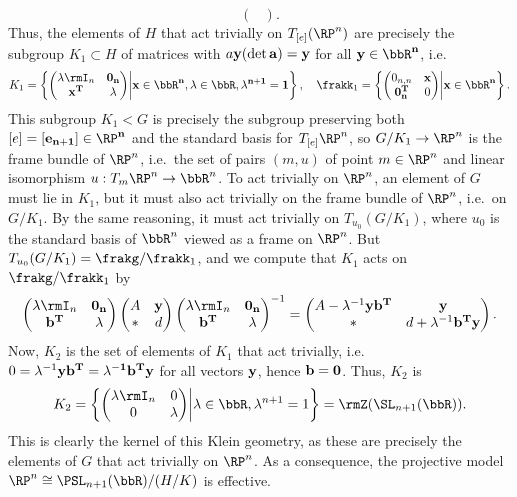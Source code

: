 \begin{example}
\[\begin{pmatrix}
    \end{pmatrix}.
    \]
    Thus, the elements of $H$ that act trivially on $T_{[e]}(\RP^n)$ are precisely the subgroup $K_1\subset H$ of matrices with $a\bf{y} (\det a)=\bf{y}$ for all $\bf{y}\in\bbR^n$, i.e.\ 
    \[K_1=\left\{ 
        \begin{pmatrix}
            \lambda \rmI_n & \bf{0}_n \\
            \bf{x}^T & \lambda
        \end{pmatrix} \middle| \bf{x}\in\bbR^n,\lambda\in\bbR, \lambda^{n+1}=1
    \right\}, \quad \frakk_1=\left\{ 
        \begin{pmatrix}
            \mathrm{0}_{n,n} & \bf{x} \\
            \bf{0}_n^T & 0
        \end{pmatrix} \middle| \bf{x}\in\bbR^n\right\}.\]
    This subgroup $K_1<G$ is precisely the subgroup preserving both $[e]=[\bf{e}_{n+1}]\in\RP^n$ and the standard basis for $T_{[e]}\RP^n$, so $G\slash K_1\to \RP^n$ is the frame bundle of $\RP^n$, i.e.\ the set of pairs $(m,u)$ of point $m\in \RP^n$ and linear isomorphism $u:T_m\RP^n\to \bbR^n$.  To act trivially on $\RP^n$, an element of $G$ must lie in $K_1$, but it must also act trivially on the frame bundle of $\RP^n$, i.e.\ on $G\slash K_1$. By the same reasoning, it must act trivially on $T_{u_0}(G\slash K_1)$, where $u_0$ is the standard basis of $\bbR^n$ viewed as a frame on $\RP^n$. But $T_{u_0}(G\slash K_1)=\frakg\slash\frakk_1$, and we compute that $K_1$ acts on $\frakg\slash\frakk_1$ by 
    \[\begin{pmatrix}
        \lambda\rmI_n & \bf{0}_n\\
        \bf{b}^T & \lambda
    \end{pmatrix}
    \begin{pmatrix}
        A & \bf{y} \\
        \ast& d
    \end{pmatrix}
    \begin{pmatrix}
        \lambda\rmI_n & \bf{0}_n\\
        \bf{b}^T & \lambda
    \end{pmatrix}^{-1}=
    \begin{pmatrix}
        A-\lambda^{-1}\bf{y}\bf{b}^T& \bf{y}\\
        \ast  & d+\lambda^{-1}\bf{b}^T\bf{y}
    \end{pmatrix}.
    \]
    Now, $K_2$ is the set of elements of $K_1$ that act trivially, i.e.\ $0=\lambda^{-1}\bf{y}\bf{b}^T=\lambda^{-1}\bf{b}^T\bf{y}$ for all vectors $\bf{y}$, hence $\bf{b}=0$. Thus, $K_2$ is 
    \[K_2=\left\{ 
        \begin{pmatrix}
            \lambda \rmI_n & 0 \\
            0 & \lambda
        \end{pmatrix} \middle| \lambda\in\bbR, \lambda^{n+1}=1
    \right\}=\rmZ(\SL_{n+1}(\bbR)).\]
    This is clearly the kernel of this Klein geometry, as these are precisely the elements of $G$ that act trivially on $\RP^n$. As a consequence, the projective model $\RP^n\cong \PSL_{n+1}(\bbR)\slash (H\slash K)$ is effective.
\end{example}


